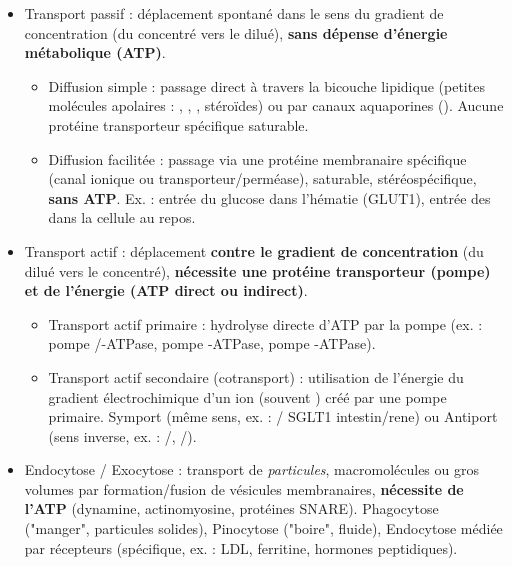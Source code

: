 \documentclass[11pt]{article}
\newcommand{\cle}[1]{{\popxbold\color{popdark}#1}}
\begin{document}
\begin{definition}
\begin{itemize}
\item \cle{Transport passif} : déplacement spontané dans le sens du gradient de concentration (du concentré vers le dilué), \textbf{sans dépense d'énergie métabolique (ATP)}.
\begin{itemize}
\item \cle{Diffusion simple} : passage direct à travers la bicouche lipidique (petites molécules apolaires : , , , stéroïdes) ou par canaux aquaporines (). Aucune protéine transporteur spécifique saturable.
\item \cle{Diffusion facilitée} : passage via une protéine membranaire spécifique (canal ionique ou transporteur/perméase), saturable, stéréospécifique, \textbf{sans ATP}. Ex. : entrée du glucose dans l'hématie (GLUT1), entrée des  dans la cellule au repos.
\end{itemize}
\item \cle{Transport actif} : déplacement \textbf{contre le gradient de concentration} (du dilué vers le concentré), \textbf{nécessite une protéine transporteur (pompe) et de l'énergie (ATP direct ou indirect)}.
\begin{itemize}
\item \cle{Transport actif primaire} : hydrolyse directe d'ATP par la pompe (ex. : pompe /-ATPase, pompe -ATPase, pompe -ATPase).
\item \cle{Transport actif secondaire (cotransport)} : utilisation de l'énergie du gradient électrochimique d'un ion (souvent ) créé par une pompe primaire. \cle{Symport} (même sens, ex. : / SGLT1 intestin/rene) ou \cle{Antiport} (sens inverse, ex. : /, /).
\end{itemize}
\item \cle{Endocytose} / \cle{Exocytose} : transport de \emph{particules}, macromolécules ou gros volumes par formation/fusion de vésicules membranaires, \textbf{nécessite de l'ATP} (dynamine, actinomyosine, protéines SNARE). \cle{Phagocytose} ("manger", particules solides), \cle{Pinocytose} ("boire", fluide), \cle{Endocytose médiée par récepteurs} (spécifique, ex. : LDL, ferritine, hormones peptidiques).
\end{itemize}
\end{definition}
\end{document}
